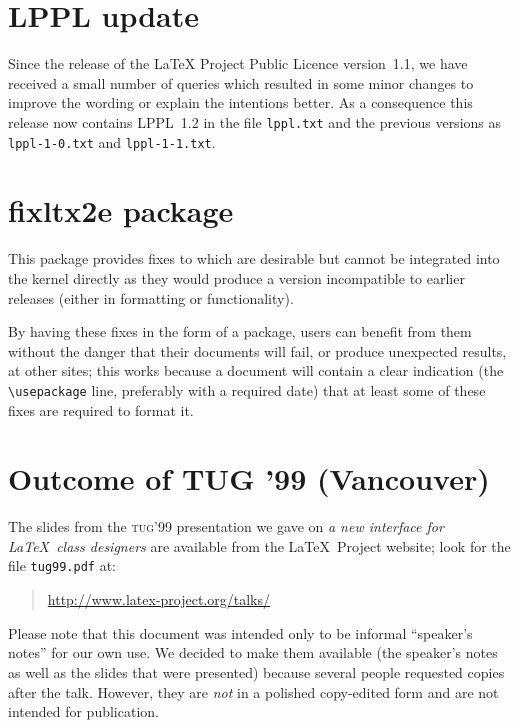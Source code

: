 \documentclass{ltnews}
\providecommand{\acro}[1]{\textsc{\MakeLowercase{#1}}}
\providecommand\file[1]{\texttt{#1}}
\begin{document}
\maketitle

\section{LPPL update}

Since the release of the \LaTeX{} Project Public Licence version~1.1,
we have received a small number of queries which resulted in some
minor changes to improve the wording or explain the intentions better.
As a consequence this release now contains LPPL~1.2 in the file
\file{lppl.txt} and the previous versions as \file{lppl-1-0.txt} and
\file{lppl-1-1.txt}.

\section{fixltx2e package}

    This package provides fixes to \LaTeXe{} which are desirable but
    cannot be integrated into the \LaTeXe{} kernel directly as they
    would produce a version incompatible to earlier releases (either
    in formatting or functionality).

    By having these fixes in the form of a package, users can benefit
    from them without the danger that their documents will fail, or
    produce unexpected results, at other sites; this works because a
    document will contain a clear indication (the \verb=\usepackage=
    line, preferably with a required date) that at least some of these
    fixes are required to format it.

\section{Outcome of TUG '99 (Vancouver)}

The slides from the \acro{TUG}'99 presentation we gave on \emph{a
new interface for \LaTeX\ class designers} are available from the
\LaTeX\ Project website; look for the file \verb|tug99.pdf| at:
\begin{quote}
   \url{http://www.latex-project.org/talks/}
\end{quote}

Please note that this document was intended only to be informal
``speaker's notes'' for our own use. We decided to make them available (the
speaker's notes as well as the slides that were presented) because several
people requested copies after the talk. However, they are \emph{not} in
a polished copy-edited form and are not intended for publication.
\end{document}
